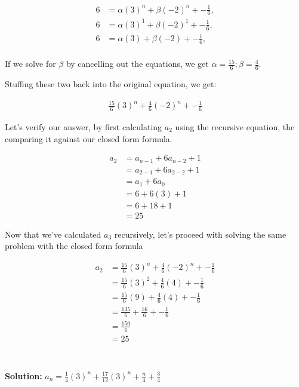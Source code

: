 \documentclass{article}
\begin{document}
\begin{align*}
6 &= \alpha(3)^n + \beta(-2)^n + -\frac{1}{6}, \\
6 &= \alpha(3)^1 + \beta(-2)^1 + -\frac{1}{6}, \\
6 &= \alpha(3) + \beta(-2) + -\frac{1}{6}, \\
\end{align*}

If we solve for $\beta$ by cancelling out the equations, we get $\alpha=\frac{15}{6};\beta=\frac{4}{6}$.

Stuffing these two back into the original equation, we get:

\begin{align*}
\frac{15}{6}(3)^n + \frac{4}{6}(-2)^n + -\frac{1}{6}
\end{align*}

Let's verify our answer, by first calculating $a_2$ using the recursive equation, the comparing it against our closed form formula.

\begin{align*}
a_2 &= a_{n-1} + 6a_{n-2} + 1 \\
    &= a_{2-1} + 6a_{2-2} + 1 \\
    &= a_{1} + 6a_{0} \\
    &= 6 + 6(3) + 1 \\
    &= 6 + 18 + 1 \\
    &= 25
\end{align*}

Now that we've calculated $a_3$ recursively, let's proceed with solving the same problem with the closed form formula

\begin{align*}
a_2 &= \frac{15}{6}(3)^n + \frac{4}{6}(-2)^n + -\frac{1}{6}\\
    &= \frac{15}{6}(3)^2 + \frac{4}{6}(4) + -\frac{1}{6}\\
    &= \frac{15}{6}(9) + \frac{4}{6}(4) + -\frac{1}{6} \\
    &= \frac{135}{6} + \frac{16}{6} + -\frac{1}{6} \\
    &= \frac{150}{6} \\
    &= 25  \\
\end{align*}

\section{}

\textbf{Solution: } $a_n = \frac{1}{4}(3)^n + \frac{17}{12}(3)^n + \frac{n}{4} + \frac{3}{4}$
\end{document}
